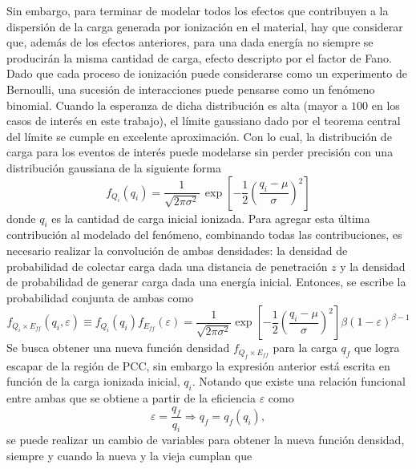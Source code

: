 Sin embargo, para terminar de modelar todos los efectos que contribuyen a la dispersión de la carga generada por ionización en el material, hay que considerar que, además de los efectos anteriores, para una dada energía no siempre se producirán la misma cantidad de carga, efecto descripto por el factor de Fano. Dado que cada proceso de ionización puede considerarse como un experimento de Bernoulli, una sucesión de interacciones puede pensarse como un fenómeno binomial. Cuando la esperanza de dicha distribución es alta (mayor a $100$ en los casos de interés en este trabajo), el límite gaussiano dado por el teorema central del límite se cumple en excelente aproximación. Con lo cual, la distribución de carga para los eventos de interés puede modelarse sin perder precisión con una distribución gaussiana de la siguiente forma
\begin{equation*}
    f_{Q_{i}}(q_{i}) = 
    \frac{1}{\sqrt{2\pi \sigma^{2}}}\,
    \exp
        \left[
            -\frac{1}{2}
            \left(
                \frac{q_{i} - \mu}{\sigma}
            \right)^{2}
        \right]
\end{equation*}
donde $q_{i}$ es la cantidad de carga inicial ionizada. Para agregar esta última contribución al modelado del fenómeno, combinando todas las contribuciones, es necesario realizar la convolución de ambas densidades: la densidad de probabilidad de colectar carga dada una distancia de penetración $z$ y la densidad de probabilidad de generar carga dada una energía inicial. Entonces, se escribe la probabilidad conjunta de ambas como
\begin{equation*}
    f_{Q_{i} \times E_{ff}} (q_{i}, \varepsilon)
    \equiv f_{Q_{i}}(q_{i}) f_{E_{ff}}(\varepsilon)
    =
    \frac{1}{\sqrt{2\pi \sigma^{2}}}
    \exp
        \left[
            -\frac{1}{2}
            \left(
                \frac{q_{i} - \mu}{\sigma}
            \right)^{2}
        \right]
    \beta(1-\varepsilon)^{\beta - 1}
\end{equation*}
Se busca obtener una nueva función densidad $f_{Q_{f}\times E_{ff}}$ para la carga $q_{f}$ que logra escapar de la región de PCC, sin embargo la expresión anterior está escrita en función de la carga ionizada inicial, $q_{i}$. Notando que existe una relación funcional entre ambas que se obtiene a partir de la eficiencia $\varepsilon$ como
\begin{equation*}
    \varepsilon = \frac{q_{f}}{q_{i}}
    \Longrightarrow
    q_{f} = q_{f}(q_{i}),
\end{equation*}
se puede realizar un cambio de variables para obtener la nueva función densidad, siempre y cuando la nueva y la vieja cumplan que

